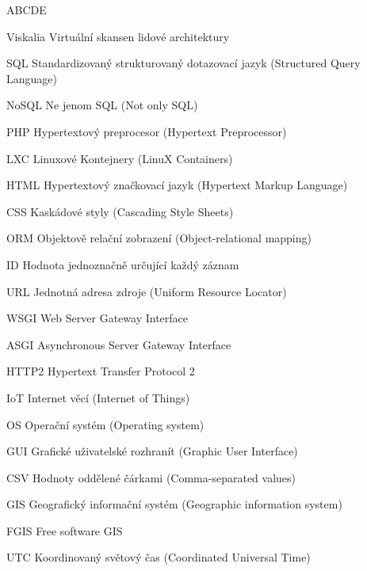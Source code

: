 \begin{seznamzkratek}{ABCDE}      

          {Viskalia}
          {Virtuální skansen lidové architektury} 

          {SQL}
          {Standardizovaný strukturovaný dotazovací jazyk (Structured Query Language)} 

          {NoSQL}
          {Ne jenom SQL (Not only SQL)} 

	{PHP}
	{Hypertextový preprocesor (Hypertext Preprocessor)}

	{LXC}
	{Linuxové Kontejnery (LinuX Containers)}

	{HTML}
	{Hypertextový značkovací jazyk (Hypertext Markup Language)}  
	             	                   
          {CSS}
          {Kaskádové styly (Cascading Style Sheets)} 
          
	{ORM}
	{Objektově relační zobrazení (Object-relational mapping)}
            
	{ID}
	{Hodnota jednoznačně určující každý záznam} 	      	     
          
          {URL}
          {Jednotná adresa zdroje (Uniform Resource Locator)}                
          
	{WSGI}
	{Web Server Gateway Interface}
                                          
          {ASGI}
          {Asynchronous Server Gateway Interface} 	
          
          {HTTP2}
          {Hypertext Transfer Protocol 2} 	

          {IoT}
          {Internet věcí (Internet of Things)} 	

          {OS}
          {Operační systém (Operating system)} 	

          {GUI}
          {Grafické uživatelské rozhranít (Graphic User Interface)} 	

          {CSV}
          {Hodnoty oddělené čárkami (Comma-separated values)} 	

          {GIS}
          {Geografický informační systém (Geographic information system)} 	

          {FGIS}
          {Free software GIS} 	

          {UTC}
          {Koordinovaný světový čas (Coordinated Universal Time)} 

	
     	      
\end{seznamzkratek}